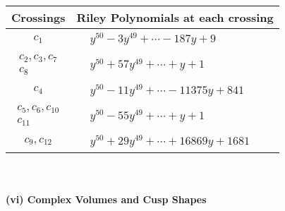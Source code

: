 \documentclass[1p]{elsarticle_modified}
\theoremstyle{definition}
\begin{document}
\begin{tabular}{m{50pt}|m{274pt}}
Crossings & \hspace{64pt}Riley Polynomials at each crossing \\
\hline $$\begin{aligned}c_{1}\end{aligned}$$&$\begin{aligned}
&y^{50}-3 y^{49}+\cdots-187 y+9
\end{aligned}$\\
\hline $$\begin{aligned}c_{2},c_{3},c_{7}\\c_{8}\end{aligned}$$&$\begin{aligned}
&y^{50}+57 y^{49}+\cdots+y+1
\end{aligned}$\\
\hline $$\begin{aligned}c_{4}\end{aligned}$$&$\begin{aligned}
&y^{50}-11 y^{49}+\cdots-11375 y+841
\end{aligned}$\\
\hline $$\begin{aligned}c_{5},c_{6},c_{10}\\c_{11}\end{aligned}$$&$\begin{aligned}
&y^{50}-55 y^{49}+\cdots+y+1
\end{aligned}$\\
\hline $$\begin{aligned}c_{9},c_{12}\end{aligned}$$&$\begin{aligned}
&y^{50}+29 y^{49}+\cdots+16869 y+1681
\end{aligned}$\\
\hline
\end{tabular}\\~\\
\newpage\flushleft \textbf{(vi) Complex Volumes and Cusp Shapes}
\end{document}
